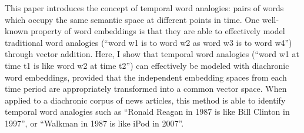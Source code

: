 This paper introduces the concept of temporal word analogies: pairs of words which occupy the same semantic space at different points in time. One well-known property of word embeddings is that they are able to effectively model traditional word analogies (``word w1 is to word w2 as word w3 is to word w4'') through vector addition. Here, I show that temporal word analogies (``word w1 at time t1 is like word w2 at time t2'') can effectively be modeled with diachronic word embeddings, provided that the independent embedding spaces from each time period are appropriately transformed into a common vector space. When applied to a diachronic corpus of news articles, this method is able to identify temporal word analogies such as ``Ronald Reagan in 1987 is like Bill Clinton in 1997'', or ``Walkman in 1987 is like iPod in 2007''.
